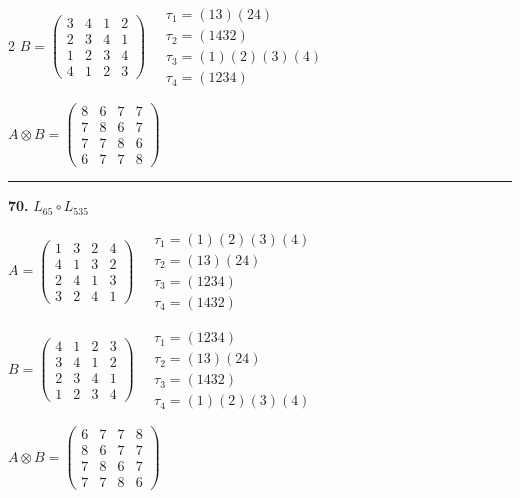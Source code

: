 \begin{multicols}{2}
$B = \begin{pmatrix} 3 & 4 & 1 & 2 \\ 2 & 3 & 4 & 1 \\ 1 & 2 & 3 & 4 \\ 4 & 1 & 2 & 3 \end{pmatrix} \quad \begin{matrix} \tau_{1}=(1 3)(2 4) \\ \tau_{2}=(1 4 3 2) \\ \tau_{3}=(1)(2)(3)(4) \\ \tau_{4}=(1 2 3 4) \end{matrix}$

$A \otimes B = \begin{pmatrix} 8 & 6 & 7 & 7 \\ 7 & 8 & 6 & 7 \\ 7 & 7 & 8 & 6 \\ 6 & 7 & 7 & 8 \end{pmatrix}$

\vspace{0.3em}
\hrule
\vspace{0.3em}

\noindent\textbf{70.} $L_{65} \circ L_{535}$

$A = \begin{pmatrix} 1 & 3 & 2 & 4 \\ 4 & 1 & 3 & 2 \\ 2 & 4 & 1 & 3 \\ 3 & 2 & 4 & 1 \end{pmatrix} \quad \begin{matrix} \tau_{1}=(1)(2)(3)(4) \\ \tau_{2}=(1 3)(2 4) \\ \tau_{3}=(1 2 3 4) \\ \tau_{4}=(1 4 3 2) \end{matrix}$

$B = \begin{pmatrix} 4 & 1 & 2 & 3 \\ 3 & 4 & 1 & 2 \\ 2 & 3 & 4 & 1 \\ 1 & 2 & 3 & 4 \end{pmatrix} \quad \begin{matrix} \tau_{1}=(1 2 3 4) \\ \tau_{2}=(1 3)(2 4) \\ \tau_{3}=(1 4 3 2) \\ \tau_{4}=(1)(2)(3)(4) \end{matrix}$

$A \otimes B = \begin{pmatrix} 6 & 7 & 7 & 8 \\ 8 & 6 & 7 & 7 \\ 7 & 8 & 6 & 7 \\ 7 & 7 & 8 & 6 \end{pmatrix}$


\end{multicols}
